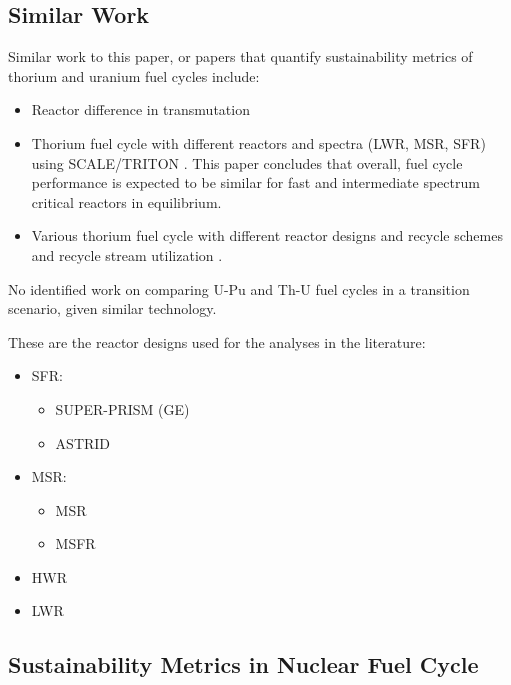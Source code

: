 \documentclass{article}
\begin{document}
\subsection{Similar Work}
Similar work to this paper, or papers that quantify
sustainability metrics of thorium and uranium fuel cycles include:
\begin{itemize}
    \item Reactor difference in transmutation \cite{becker_transmutation_2007}
    \item Thorium fuel cycle with different reactors and spectra (\gls{LWR}, \gls{MSR}, \gls{SFR}) using SCALE/TRITON \cite{brown_sustainable_2015}. This paper concludes that overall, fuel cycle performance is expected to be similar for fast and intermediate spectrum critical reactors in equilibrium.
    \item Various thorium fuel cycle with different reactor designs and recycle schemes and recycle stream utilization \cite{taiwo_thorium_2016} \cite{krahn_-ne0000735_2017}.
\end{itemize}

No identified work on comparing U-Pu and Th-U fuel cycles
in a transition scenario, given similar technology.



These are the reactor designs used for the analyses in the literature:
\begin{itemize}
    \item SFR:
    \begin{itemize}
        \item SUPER-PRISM (GE) \cite{carroll_super-prism_2002}
        \item ASTRID \cite{varaine_pre-conceptual_2012}
    \end{itemize}
    \item MSR:
    \begin{itemize}
        \item MSR \cite{robertson_conceptual_1971}
        \item MSFR \cite{fiorina_molten_2013}
    \end{itemize}
    \item HWR \cite{boczar_thorium_2002} \cite{bromley_multiregion_2016} \cite{golesorkhi_simulations_2016}
    \item LWR \cite{ade_analysis_2016}
\end{itemize}


\subsection{Sustainability Metrics in Nuclear Fuel Cycle}
\end{document}
